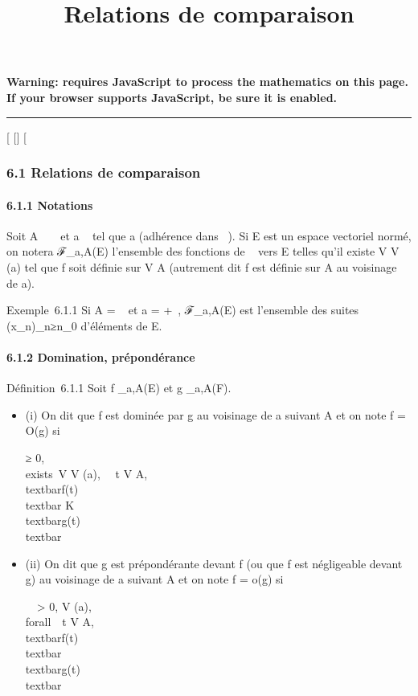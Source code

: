 \documentclass[]{article}
\title{Relations de comparaison}
\author{}
\date{}
\begin{document}
\maketitle

\textbf{Warning: 
requires JavaScript to process the mathematics on this page.\\ If your
browser supports JavaScript, be sure it is enabled.}

\begin{center}\rule{3in}{0.4pt}\end{center}

{[}
{[}{]}
{[}

\subsubsection{6.1 Relations de comparaison}

\paragraph{6.1.1 Notations}

Soit A \subset~ ~ et a \in\overline{}~ tel que a
\in\overlineA (adhérence dans
\overline{}~). Si E est un espace vectoriel normé, on
notera ℱ\_a,A(E) l'ensemble des fonctions de ~ vers E telles
qu'il existe V \in V (a) tel que f soit définie sur V \bigcap A (autrement dit f
est définie sur A au voisinage de a).

Exemple~6.1.1 Si A = ~ et a = +\infty~, ℱ\_a,A(E) est l'ensemble des
suites (x\_n)\_n≥n\_0 d'éléments de E.

\paragraph{6.1.2 Domination, prépondérance}

Définition~6.1.1 Soit f \_a,A(E) et g \_a,A(F).

\begin{itemize}
\item
  (i) On dit que f est dominée par g au voisinage de a suivant A et on
  note f = O(g) si

  \existsK ≥ 0, \\exists~V \in V
  (a), \forall~~t \in V \bigcap A,
  \\textbar{}f(t)\\textbar{} \leq
  K\\textbar{}g(t)\\textbar{}
\item
  (ii) On dit que g est prépondérante devant f (ou que f est négligeable
  devant g) au voisinage de a suivant A et on note f = o(g) si

  \forall~~\epsilon \textgreater{} 0,
  \existsV \in V (a), \\forall~~t \in V
  \bigcap A, \\textbar{}f(t)\\textbar{} \leq
  \epsilon\\textbar{}g(t)\\textbar{}
\end{itemize}
\end{document}
